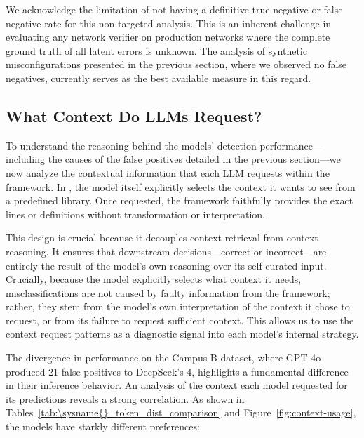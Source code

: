 We acknowledge the limitation of not having a definitive true negative or false negative rate for this non-targeted analysis. This is an inherent challenge in evaluating any network verifier on production networks where the complete ground truth of all latent errors is unknown. The analysis of synthetic misconfigurations presented in the previous section, where we observed no false negatives, currently serves as the best available measure in this regard.


\subsection{What Context Do LLMs Request?}
\label{subsec:analysis}

To understand the reasoning behind the models' detection performance—including the causes of the false positives detailed in the previous section—we now analyze the contextual information that each LLM requests within the \sysname{} framework. In \sysname{}, the model itself explicitly selects the context it wants to see from a predefined library. Once requested, the framework faithfully provides the exact lines or definitions without transformation or interpretation.

This design is crucial because it decouples context retrieval from context reasoning. It ensures that downstream decisions—correct or incorrect—are entirely the result of the model’s own reasoning over its self-curated input. Crucially, because the model explicitly selects what context it needs, misclassifications are not caused by faulty information from the framework; rather, they stem from the model's own interpretation of the context it chose to request, or from its failure to request sufficient context. This allows us to use the context request patterns as a diagnostic signal into each model's internal strategy.

The divergence in performance on the Campus B dataset, where GPT-4o produced 21 false positives to DeepSeek's 4, highlights a fundamental difference in their inference behavior. An analysis of the context each model requested for its predictions reveals a strong correlation. As shown in Tables~\ref{tab:\sysname{}_token_dist_comparison} and Figure~\ref{fig:context-usage}, the models have starkly different preferences:

